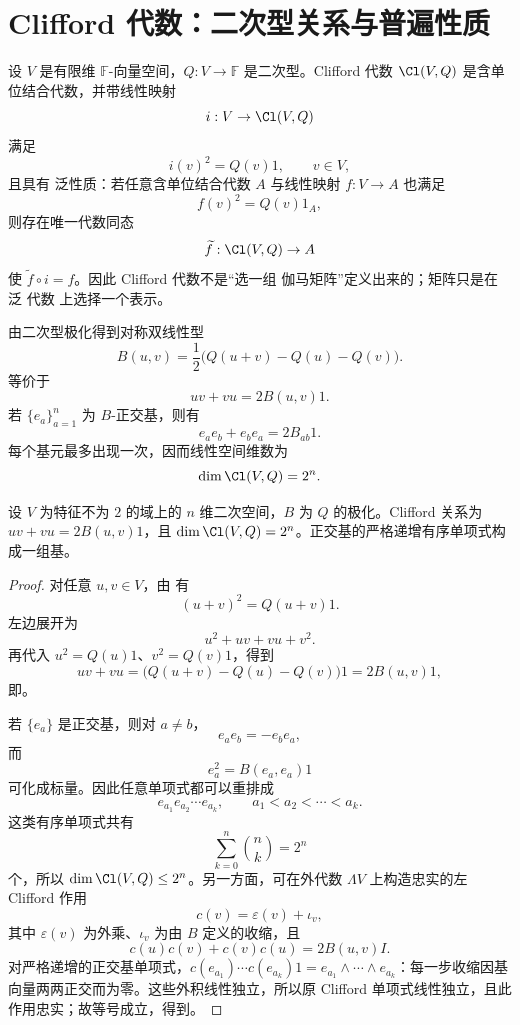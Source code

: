 \section{Clifford 代数：二次型关系与普遍性质}
\label{sec:clifford-universal}
设 $V$ 是有限维 $\mathbb F$-向量空间，$Q:V\to\mathbb F$ 是二次型。Clifford 代数 $\Cl(V,Q)$ 是含单位结合代数，并带线性映射
\[
i:V\to\Cl(V,Q)
\]
满足
\begin{equation}
i(v)^2=Q(v)1,
\qquad v\in V,
\label{eq:clifford-defining-relation}
\end{equation}
且具有 泛性质：若任意含单位结合代数 $A$ 与线性映射 $f:V\to A$ 也满足
\[
f(v)^2=Q(v)1_A,
\]
则存在唯一代数同态
\[
\widetilde f:\Cl(V,Q)\to A
\]
使 $\widetilde f\circ i=f$。因此 Clifford 代数不是“选一组 伽马矩阵”定义出来的；矩阵只是在 泛 代数 上选择一个表示。

由二次型极化得到对称双线性型
\[
B(u,v)=\frac12\bigl(Q(u+v)-Q(u)-Q(v)\bigr).
\]
 等价于
\begin{equation}
uv+vu=2B(u,v)1.
\label{eq:clifford-anticommutator}
\end{equation}
若 $\{e_a\}_{a=1}^n$ 为 $B$-正交基，则有
\[
e_ae_b+e_be_a=2B_{ab}1.
\]
每个基元最多出现一次，因而线性空间维数为
\begin{equation}
\dim\Cl(V,Q)=2^n.
\label{eq:clifford-dimension}
\end{equation}

\begin{theorem}
设 $V$ 为特征不为 $2$ 的域上的 $n$ 维二次空间，$B$ 为 $Q$ 的极化。Clifford 关系为 $uv+vu=2B(u,v)1$，且 $\dim\Cl(V,Q)=2^n$。正交基的严格递增有序单项式构成一组基。
\end{theorem}
\begin{proof}
对任意 $u,v\in V$，由 有
\[
(u+v)^2=Q(u+v)1.
\]
左边展开为
\[
u^2+uv+vu+v^2.
\]
再代入 $u^2=Q(u)1$、$v^2=Q(v)1$，得到
\[
uv+vu
=\bigl(Q(u+v)-Q(u)-Q(v)\bigr)1
=2B(u,v)1,
\]
即。

若 $\{e_a\}$ 是正交基，则对 $a\neq b$，
\[
e_ae_b=-e_be_a,
\]
而
\[
e_a^2=B(e_a,e_a)1
\]
可化成标量。因此任意单项式都可以重排成
\[
e_{a_1}e_{a_2}\cdots e_{a_k},
\qquad
a_1<a_2<\cdots<a_k.
\]
这类有序单项式共有
\[
\sum_{k=0}^n\binom nk=2^n
\]
个，所以 $\dim\Cl(V,Q)\le2^n$。另一方面，可在外代数 $\Lambda V$ 上构造忠实的左 Clifford 作用
\[
c(v)=\varepsilon(v)+\iota_v,
\]
其中 $\varepsilon(v)$ 为外乘、$\iota_v$ 为由 $B$ 定义的收缩，且
\[
c(u)c(v)+c(v)c(u)=2B(u,v)I.
\]
对严格递增的正交基单项式，$c(e_{a_1})\cdots c(e_{a_k})1=e_{a_1}\wedge\cdots\wedge e_{a_k}$：每一步收缩因基向量两两正交而为零。这些外积线性独立，所以原 Clifford 单项式线性独立，且此作用忠实；故等号成立，得到。
\end{proof}


